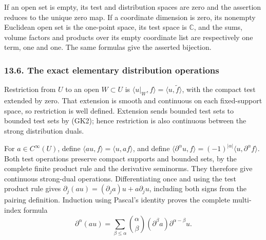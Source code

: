 \documentclass[
  11pt,
]{article}
\begin{document}
If an open set is empty, its test and distribution spaces are zero and
the assertion reduces to the unique zero map. If a coordinate dimension
is zero, its nonempty Euclidean open set is the one-point space, its
test space is \(\mathbb C\), and the sums, volume factors and products
over its empty coordinate list are respectively one term, one and one.
The same formulas give the asserted bijection.

\subsubsection{13.6. The exact elementary distribution
operations}\label{the-exact-elementary-distribution-operations}

Restriction from \(U\) to an open \(W\subset U\) is
\(\langle u|_W,f\rangle=\langle u,\widetilde f\rangle\), with the
compact test extended by zero. That extension is smooth and continuous
on each fixed-support space, so restriction is well defined. Extension
sends bounded test sets to bounded test sets by (GK2); hence restriction
is also continuous between the strong distribution duals.

For \(a\in C^\infty(U)\), define
\(\langle au,f\rangle=\langle u,af\rangle\), and define
\(\langle\partial^\alpha u,f\rangle=(-1)^{|\alpha|}\langle u,\partial^\alpha f\rangle\).
Both test operations preserve compact supports and bounded sets, by the
complete finite product rule and the derivative seminorms. They
therefore give continuous strong-dual operations. Differentiating once
and using the test product rule gives
\(\partial_j(au)=(\partial_j a)u+a\partial_j u\), including both signs
from the pairing definition. Induction using Pascal's identity proves
the complete multi-index formula \[
 \partial^\alpha(au)=
   \sum_{\beta\leq\alpha}\binom{\alpha}{\beta}
                (\partial^\beta a)\partial^{\alpha-\beta}u.
 \tag{GK23}
\]
\end{document}
